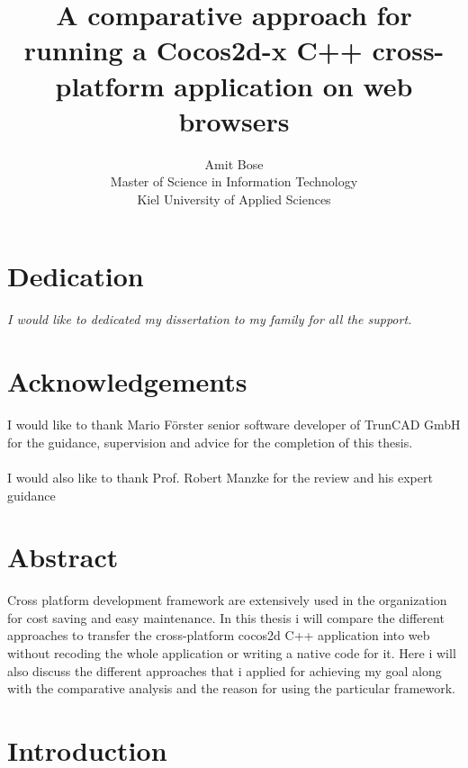 \documentclass[23pt]{article}
\title{A comparative approach for running a Cocos2d-x C++ cross- platform application on web browsers}
\author{Amit Bose\\  Master of Science in Information Technology\\  Kiel University of Applied Sciences }
\begin{document}
\maketitle
{}
\newpage
{}

\tableofcontents
\listoffigures

\newpage

\section{Dedication}

\textit{ \newline \newline I would like to dedicated my dissertation to  my family for all the support. }

\newpage

\section{Acknowledgements}

{\Large  I would like to thank Mario F\"{o}rster senior software developer of TrunCAD GmbH for the  guidance, supervision and  advice for the completion of this thesis.\\  \\ I would also like to thank Prof. Robert Manzke for the review and his expert guidance \par}

\newpage

\section{Abstract}

{\Large Cross platform development framework are extensively used in the organization for cost saving and easy maintenance. In this thesis i will compare the different approaches to transfer the cross-platform cocos2d C++  application into web without recoding the whole application or writing a native code for it. Here i will also discuss the different approaches that i applied for achieving my goal along with the comparative analysis and the reason for using the particular framework.
\par}


\newpage
\section{Introduction }
\end{document}
